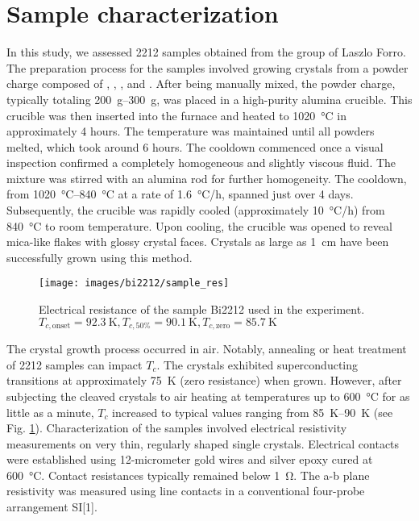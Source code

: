 \section{Sample characterization}

In this study, we assessed 2212 samples obtained from the group of Laszlo Forro.
The preparation process for the samples involved growing crystals from a powder charge composed of , , , and .
After being manually mixed, the powder charge, typically totaling \qtyrange{200}{300}{\gram}, was placed in a high-purity alumina crucible.
This crucible was then inserted into the furnace and heated to \qty{1020}{\degreeCelsius} in approximately 4 hours.
The temperature was maintained until all powders melted, which took around 6 hours.
The cooldown commenced once a visual inspection confirmed a completely homogeneous and slightly viscous fluid.
The mixture was stirred with an alumina rod for further homogeneity.
The cooldown, from \qtyrange{1020}{840}{\degreeCelsius} at a rate of \qty{1.6}{\degreeCelsius/\hour}, spanned just over 4 days.
Subsequently, the crucible was rapidly cooled (approximately \qty{10}{\degreeCelsius/\hour}) from \qty{840}{\degreeCelsius} to room temperature.
Upon cooling, the crucible was opened to reveal mica-like flakes with glossy crystal faces. Crystals as large as \qty{1}{\centi\meter} have been successfully grown using this method.

\begin{figure}
	\centering
	\texttt{[image: images/bi2212/sample\_res]}
	\caption{Electrical resistance of the sample Bi2212 used in the experiment. $T_{c,\text{onset}}=\qty{92.3}{\kelvin}, T_{c,\text{50\%}}=\qty{90.1}{\kelvin}, T_{c,\text{zero}}=\qty{85.7}{\kelvin}$}
	\label{fig:sampleres}
\end{figure}


The crystal growth process occurred in air.
Notably, annealing or heat treatment of 2212 samples can impact $T_c$.
The crystals exhibited superconducting transitions at approximately \qty{75}{\kelvin} (zero resistance) when grown.
However, after subjecting the cleaved crystals to air heating at temperatures up to \qty{600}{\degreeCelsius} for as little as a minute, $T_c$ increased to typical values ranging from \qtyrange{85}{90}{\kelvin} (see Fig. \ref{}).
Characterization of the samples involved electrical resistivity measurements on very thin, regularly shaped single crystals. Electrical contacts were established using 12-micrometer gold wires and silver epoxy cured at \qty{600}{\degreeCelsius}.
Contact resistances typically remained below \qty{1}{\ohm}.
The a-b plane resistivity was measured using line contacts in a conventional four-probe arrangement \cite{} SI[1].

